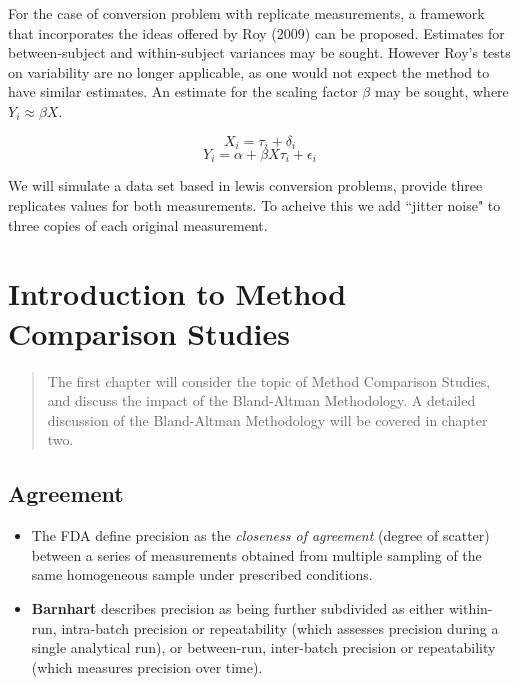 \documentclass[12pt, a4paper]{report}
\theoremstyle{plain}
\theoremstyle{definition}
\theoremstyle{remark}
\begin{document}
For the case of conversion problem with replicate measurements, a framework that incorporates the ideas offered by Roy (2009) can be proposed. Estimates for between-subject and within-subject variances may be sought.
However Roy's tests on variability are no longer applicable, as one would not expect the method to have similar estimates. An estimate for the scaling factor $\beta$ may be sought, where $Y_i \approx \beta X$.


\[ X_i = \tau_i + \delta_i \]
\[ Y_i = \alpha + \beta X \tau_i + \epsilon_i\]


We will simulate a data set based in lewis conversion problems, provide three replicates values for both measurements. To acheive this we add ``jitter noise" to three copies of each original measurement.



	
	


	

	\chapter{Introduction to Method Comparison Studies}
	\begin{abstract}
		The first chapter will consider the topic of Method Comparison Studies, and discuss the impact of the Bland-Altman Methodology. A detailed discussion of the Bland-Altman Methodology will be covered in chapter two.
	\end{abstract}
	
	


	\section{Agreement}
	\begin{itemize}
		\item The FDA define precision as the \textit{closeness of agreement} (degree of
		scatter) between a series of measurements obtained from multiple
		sampling of the same homogeneous sample under prescribed
		conditions. 
		\item \textbf{Barnhart} describes precision as being further
		subdivided as either within-run, intra-batch precision or
		repeatability (which assesses precision during a single analytical
		run), or between-run, inter-batch precision or repeatability
		(which measures precision over time).
	\end{itemize}
	
\end{document}
